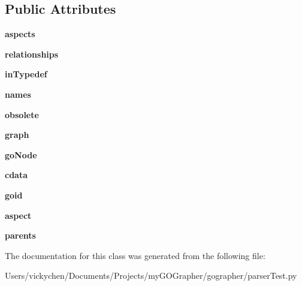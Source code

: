 \subsection*{Public Attributes}
\begin{DoxyCompactItemize}
\item 
\hypertarget{classparser_test_1_1xml_graph_ac124fcc400ae2c819bed950b1c3a3c82}{
{\bfseries aspects}}
\label{classparser_test_1_1xml_graph_ac124fcc400ae2c819bed950b1c3a3c82}

\item 
\hypertarget{classparser_test_1_1xml_graph_a45319def72639815941a39ce2e5d3ae7}{
{\bfseries relationships}}
\label{classparser_test_1_1xml_graph_a45319def72639815941a39ce2e5d3ae7}

\item 
\hypertarget{classparser_test_1_1xml_graph_a6769b5a075cf03d15d034bb028c12e48}{
{\bfseries inTypedef}}
\label{classparser_test_1_1xml_graph_a6769b5a075cf03d15d034bb028c12e48}

\item 
\hypertarget{classparser_test_1_1xml_graph_a7f95740f88b93301ae942b90853330d3}{
{\bfseries names}}
\label{classparser_test_1_1xml_graph_a7f95740f88b93301ae942b90853330d3}

\item 
\hypertarget{classparser_test_1_1xml_graph_aefa27ccd8b928930b148015dbbcd2cc2}{
{\bfseries obsolete}}
\label{classparser_test_1_1xml_graph_aefa27ccd8b928930b148015dbbcd2cc2}

\item 
\hypertarget{classparser_test_1_1xml_graph_a2f7abf422410d18d4f83bc057bb9ea72}{
{\bfseries graph}}
\label{classparser_test_1_1xml_graph_a2f7abf422410d18d4f83bc057bb9ea72}

\item 
\hypertarget{classparser_test_1_1xml_graph_af97e222dc4023078247e172b0ffdde3f}{
{\bfseries goNode}}
\label{classparser_test_1_1xml_graph_af97e222dc4023078247e172b0ffdde3f}

\item 
\hypertarget{classparser_test_1_1xml_graph_a0d638ddc5ca775ce7e33d981fd44b6ee}{
{\bfseries cdata}}
\label{classparser_test_1_1xml_graph_a0d638ddc5ca775ce7e33d981fd44b6ee}

\item 
\hypertarget{classparser_test_1_1xml_graph_a96cf9f27f1992443bc907885acc521f6}{
{\bfseries goid}}
\label{classparser_test_1_1xml_graph_a96cf9f27f1992443bc907885acc521f6}

\item 
\hypertarget{classparser_test_1_1xml_graph_a51f3483f5a5e0f7aedf3583d13236b1e}{
{\bfseries aspect}}
\label{classparser_test_1_1xml_graph_a51f3483f5a5e0f7aedf3583d13236b1e}

\item 
\hypertarget{classparser_test_1_1xml_graph_a47c36c69366c24de7b9006a282653968}{
{\bfseries parents}}
\label{classparser_test_1_1xml_graph_a47c36c69366c24de7b9006a282653968}

\end{DoxyCompactItemize}


The documentation for this class was generated from the following file:\begin{DoxyCompactItemize}
\item 
Users/vickychen/Documents/Projects/myGOGrapher/gographer/parserTest.py\end{DoxyCompactItemize}
